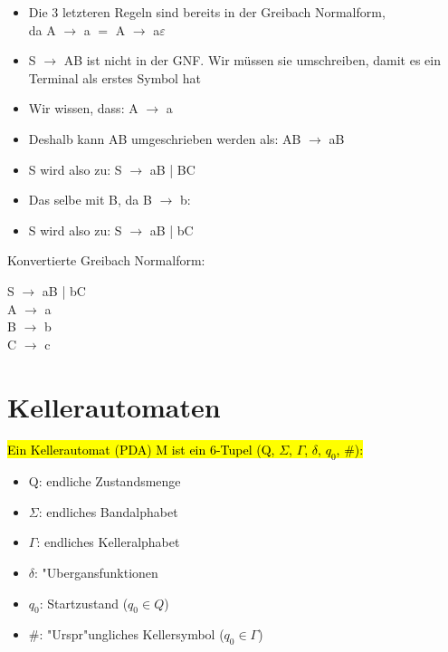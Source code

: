 \documentclass[11pt, a4paper]{scrartcl}
\begin{document}
\begin{itemize}
    \item Die 3 letzteren Regeln sind bereits in der Greibach Normalform,\\ da A $\rightarrow$ a $=$ A $\rightarrow$ a$\varepsilon$
    \item S $\rightarrow$ AB ist nicht in der GNF. Wir müssen sie umschreiben, damit es ein Terminal als erstes Symbol hat
    \item Wir wissen, dass: A $\rightarrow$ a 
    \item Deshalb kann AB umgeschrieben werden als: AB $\rightarrow$ aB
    \item S wird also zu: S $\rightarrow$ aB | BC
    \item Das selbe mit B, da B $\rightarrow$ b:
    \item S wird also zu: S $\rightarrow$ aB | bC
\end{itemize}

Konvertierte Greibach Normalform:

S $\rightarrow$ aB | bC \\
A $\rightarrow$ a \\
B $\rightarrow$ b \\
C $\rightarrow$ c \\























\newpage


\section{Kellerautomaten}

\hl{Ein Kellerautomat (PDA) M ist ein 6-Tupel (Q, $\Sigma$, $\Gamma$, $\delta$, $q_0$, $\#$):}

\begin{itemize}
    \item Q: endliche Zustandsmenge
    \item $\Sigma$: endliches Bandalphabet
    \item $\Gamma$: endliches Kelleralphabet
    \item $\delta$: "Ubergansfunktionen
    \item $q_0$: Startzustand ($q_0 \in Q$)
    \item $\#$: "Urspr"ungliches Kellersymbol ($q_0 \in \Gamma$)
\end{itemize}
\end{document}
